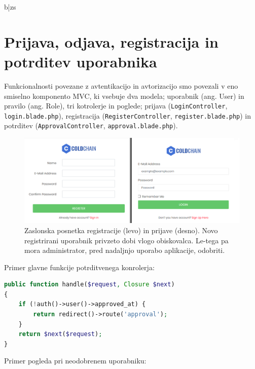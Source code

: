 \documentclass[a4paper, 12pt]{book}
\begin{document}
\begin{table}[htbp]
\begin{tabularx}{\textwidth}{b|zs}
	\end{tabularx}
	\caption{Seznam in opis vseh usmerjevalnikov aplikacije.}
	\label{tabela-url}
\end{table}


\section{Prijava, odjava, registracija in potrditev uporabnika}

Funkcionalnosti povezane z avtentikacijo in avtorizacijo smo povezali v eno smiselno komponento MVC, ki vsebuje dva modela; uporabnik (ang. User) in pravilo (ang. Role), tri kotrolerje in poglede; prijava (\verb=LoginController=, \verb=login.blade.php=), registracija (\verb=RegisterController=, \verb=register.blade.php=) in potrditev (\verb=ApprovalController=, \verb=approval.blade.php=).

\begin{figure}[h]
\begin{center}
\includegraphics[width=\textwidth]{slike/registration_login.png}
\end{center}
\caption{Zaslonska posnetka registracije (levo) in prijave (desno). Novo registrirani uporabnik privzeto dobi vlogo obiskovalca. Le-tega pa mora administrator, pred nadaljnjo uporabo aplikacije, odobriti.}
\label{ss-registration-login}
\end{figure}

Primer glavne funkcije potrditvenega konrolerja:

\begin{lstlisting}[language=PHP, style=mystyle]
public function handle($request, Closure $next)
{
    if (!auth()->user()->approved_at) {
        return redirect()->route('approval');
    }
    return $next($request);
}
\end{lstlisting}

\newpage 

Primer pogleda pri neodobrenem uporabniku:
\end{document}

